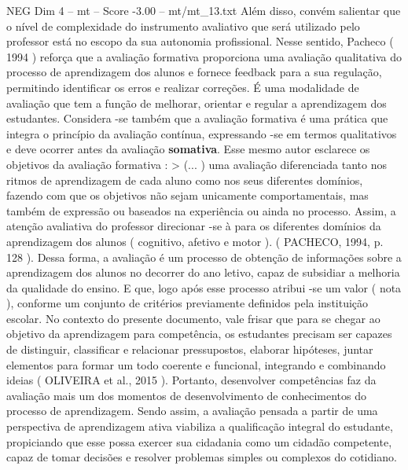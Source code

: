 \begin{textsample}{NEG Dim 4 – mt – Score -3.00 – mt/mt\_13.txt}
Além disso, convém salientar que o nível de complexidade do instrumento avaliativo que será utilizado pelo professor está no escopo da sua autonomia profissional.
Nesse sentido, Pacheco ( 1994 ) reforça que a avaliação formativa proporciona uma avaliação qualitativa do processo de aprendizagem dos alunos e fornece feedback para a sua regulação, permitindo identificar os erros e realizar correções.
É uma modalidade de avaliação que tem a função de melhorar, orientar e regular a aprendizagem dos estudantes.
Considera -se também que a avaliação formativa é uma prática que integra o princípio da avaliação contínua, expressando -se em termos qualitativos e deve ocorrer antes da avaliação \textbf{somativa}.
Esse mesmo autor esclarece os objetivos da avaliação formativa : > (... ) uma avaliação diferenciada tanto nos ritmos de aprendizagem de cada aluno como nos seus diferentes domínios, fazendo com que os objetivos não sejam unicamente comportamentais, mas também de expressão ou baseados na experiência ou ainda no processo.
Assim, a atenção avaliativa do professor direcionar -se à para os diferentes domínios da aprendizagem dos alunos ( cognitivo, afetivo e motor ). ( PACHECO, 1994, p. 128 ).
Dessa forma, a avaliação é um processo de obtenção de informações sobre a aprendizagem dos alunos no decorrer do ano letivo, capaz de subsidiar a melhoria da qualidade do ensino.
E que, logo após esse processo atribui -se um valor ( nota ), conforme um conjunto de critérios previamente definidos pela instituição escolar.
No contexto do presente documento, vale frisar que para se chegar ao objetivo da aprendizagem para competência, os estudantes precisam ser capazes de distinguir, classificar e relacionar pressupostos, elaborar hipóteses, juntar elementos para formar um todo coerente e funcional, integrando e combinando ideias ( OLIVEIRA et al., 2015 ).
Portanto, desenvolver competências faz da avaliação mais um dos momentos de desenvolvimento de conhecimentos do processo de aprendizagem.
Sendo assim, a avaliação pensada a partir de uma perspectiva de aprendizagem ativa viabiliza a qualificação integral do estudante, propiciando que esse possa exercer sua cidadania como um cidadão competente, capaz de tomar decisões e resolver problemas simples ou complexos do cotidiano.

\end{textsample}
